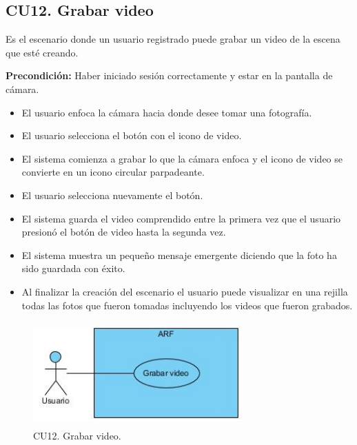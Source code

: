 \subsection{CU12. Grabar video}\par
Es el escenario donde un usuario registrado puede grabar un video de la escena que esté creando.\par
\textbf{Precondición:} Haber iniciado sesión correctamente y estar en la pantalla de cámara.\par
\begin{itemize}
	\item El usuario enfoca la cámara hacia donde desee tomar una fotografía.
	\item El usuario selecciona el botón con el icono de video.
	\item El sistema comienza a grabar lo que la cámara enfoca y el icono de video se convierte en un icono circular parpadeante.
	\item El usuario selecciona nuevamente el botón.
	\item El sistema guarda el video comprendido entre la primera vez que el usuario presionó el botón de video hasta la segunda vez.
	\item El sistema muestra un pequeño mensaje emergente diciendo que la foto ha sido guardada con éxito.
	\item Al finalizar la creación del escenario el usuario puede visualizar en una rejilla todas las fotos que fueron tomadas incluyendo los videos que fueron grabados.
\end{itemize}

\begin{figure}[h!]
	\centering
	\includegraphics[width=8cm,height=4cm]{imagenes/analisis/cu/grabar_video.jpg}
	\caption{CU12. Grabar video.}
	\label{fig:grabarvideo}
\end{figure} 

